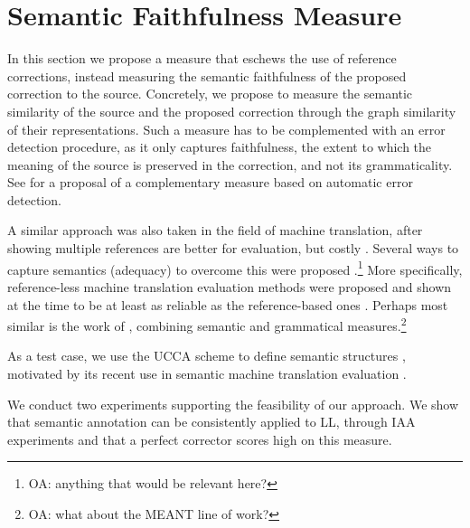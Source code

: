 \documentclass[letterpaper, 11pt]{article}
\newcommand{\oa}[1]{\footnote{\color{red}OA: #1}}
\begin{document}
\section{Semantic Faithfulness Measure}\label{sec:Semantics}
%
%
%
%

In this section we propose a measure that eschews the use
of reference corrections, instead measuring the semantic faithfulness of the proposed
correction to the source.
Concretely, we propose to measure the semantic similarity of the source and the proposed correction
through the graph similarity of their representations.
Such a measure has to be complemented with an
error detection procedure, as it only captures faithfulness, the extent to which
the meaning of the source is preserved in the correction,
and not its grammaticality.
See 
for a proposal of a complementary measure based
on automatic error detection.

A similar approach was also taken in the field of machine translation, after showing multiple references are better for evaluation, but costly \cite{albrecht-hwa:2008:WMT,turian2006evaluation}. Several ways to capture semantics (adequacy) to overcome this were proposed \cite{snover2009fluency}.\oa{anything that would be relevant here?}
More specifically, reference-less machine translation evaluation methods were proposed and shown at the time to be at least as reliable as the reference-based ones \cite{reeder2006measuring,albrecht2007regression,specia2009estimating,specia2010machine}. Perhaps most similar is the work of ,
combining semantic and grammatical measures.\oa{what about the MEANT line of work?}

As a test case, we use the UCCA scheme to define semantic structures \cite{abend2013universal},
motivated by its recent use in semantic machine translation evaluation \cite{birch2016hume}.

We conduct two experiments supporting the feasibility of our approach.
We show that semantic annotation can be consistently applied to LL,
through IAA experiments and that a perfect corrector scores high on this measure.
\end{document}
